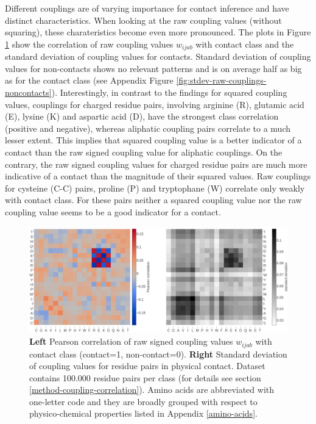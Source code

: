 \documentclass[11pt,a4paper,twoside]{book}
\newcommand{\wijab}{w_{ijab}}
\theoremstyle{definition}
\theoremstyle{definition}
\theoremstyle{remark}
\begin{document}
Different couplings are of varying importance for contact inference and
have distinct characteristics. When looking at the raw coupling values
(without squaring), these charateristics become even more pronounced.
The plots in Figure \ref{fig:coupling-correlation} show the correlation
of raw coupling values \(\wijab\) with contact class and the standard
deviation of coupling values for contacts. Standard deviation of
coupling values for non-contacts shows no relevant patterns and is on
average half as big as for the contact class (see Appendix Figure
\ref{fig:stdev-raw-couplings-noncontacts}). Interestingly, in contrast
to the findings for squared coupling values, couplings for charged
residue pairs, involving arginine (R), glutamic acid (E), lysine (K) and
aspartic acid (D), have the strongest class correlation (positive and
negative), whereas aliphatic coupling pairs correlate to a much lesser
extent. This implies that squared coupling value is a better indicator
of a contact than the raw signed coupling value for aliphatic couplings.
On the contrary, the raw signed coupling values for charged residue
pairs are much more indicative of a contact than the magnitude of their
squared values. Raw couplings for cysteine (C-C) pairs, proline (P) and
tryptophane (W) correlate only weakly with contact class. For these
pairs neither a squared coupling value nor the raw coupling value seems
to be a good indicator for a contact.










\begin{figure}
\includegraphics[width=1\linewidth]{img/coupling_matrix_analysis/combi_couplings_correlation_and_stddev_heatmap_notitle} \caption{\textbf{Left} Pearson correlation of
raw signed coupling values \(\wijab\) with contact class (contact=1,
non-contact=0). \textbf{Right} Standard deviation of coupling values for
residue pairs in physical contact. Dataset contains 100.000 residue
pairs per class (for details see section
\ref{method-coupling-correlation}). Amino acids are abbreviated with
one-letter code and they are broadly grouped with respect to
physico-chemical properties listed in Appendix \ref{amino-acids}.}\label{fig:coupling-correlation}
\end{figure}
\end{document}
